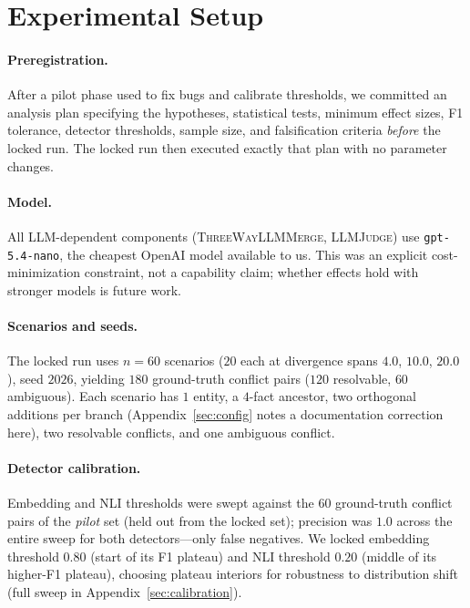\documentclass[11pt]{article}
\begin{document}
\section{Experimental Setup}
\label{sec:setup}

\paragraph{Preregistration.} After a pilot phase used to fix bugs and calibrate
thresholds, we committed an analysis plan specifying the hypotheses, statistical
tests, minimum effect sizes, F1 tolerance, detector thresholds, sample size, and
falsification criteria \emph{before} the locked run. The locked run then executed
exactly that plan with no parameter changes.

\paragraph{Model.} All LLM-dependent components (\textsc{ThreeWayLLMMerge},
\textsc{LLMJudge}) use \texttt{gpt-5.4-nano}, the cheapest OpenAI model
available to us. This was an explicit cost-minimization constraint, not a
capability claim; whether effects hold with stronger models is future work.

\paragraph{Scenarios and seeds.} The locked run uses $n{=}60$ scenarios ($20$
each at divergence spans $4.0$, $10.0$, $20.0$), seed $2026$, yielding $180$
ground-truth conflict pairs ($120$ resolvable, $60$ ambiguous). Each scenario
has $1$ entity, a $4$-fact ancestor, two orthogonal additions per branch
(Appendix~\ref{sec:config} notes a documentation correction here), two
resolvable conflicts, and one ambiguous conflict.

\paragraph{Detector calibration.} Embedding and NLI thresholds were swept
against the $60$ ground-truth conflict pairs of the \emph{pilot} set (held out
from the locked set); precision was $1.0$ across the entire sweep for both
detectors---only false negatives. We locked embedding threshold $0.80$
(start of its F1 plateau) and NLI threshold $0.20$ (middle of its
higher-F1 plateau), choosing plateau interiors for robustness to
distribution shift (full sweep in Appendix~\ref{sec:calibration}).
\end{document}
